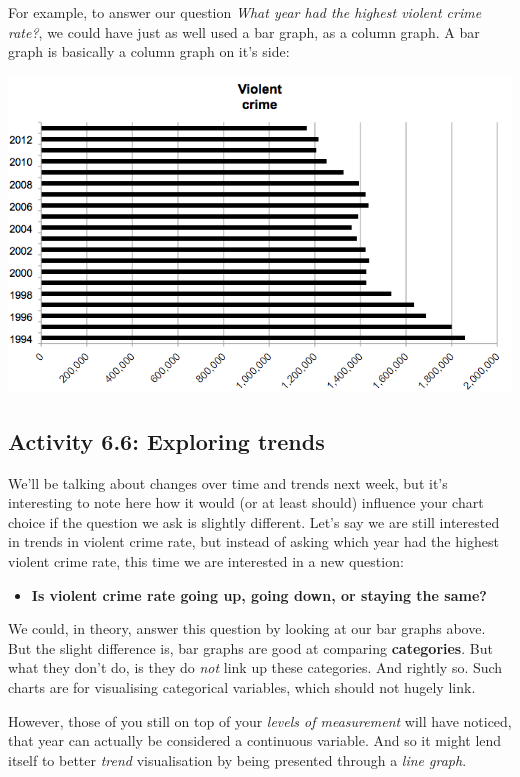 \documentclass[
]{book}
\providecommand{\tightlist}{%
  \setlength{\itemsep}{0pt}\setlength{\parskip}{0pt}}
\begin{document}
For example, to answer our question \emph{What year had the highest violent crime rate?}, we could have just as well used a bar graph, as a column graph. A bar graph is basically a column graph on it's side:

\includegraphics{imgs/bar_same_col.png}

\hypertarget{activity-6.6-exploring-trends}{%
\subsection{Activity 6.6: Exploring trends}\label{activity-6.6-exploring-trends}}

We'll be talking about changes over time and trends next week, but it's interesting to note here how it would (or at least should) influence your chart choice if the question we ask is slightly different. Let's say we are still interested in trends in violent crime rate, but instead of asking which year had the highest violent crime rate, this time we are interested in a new question:

\begin{itemize}
\tightlist
\item
  \textbf{Is violent crime rate going up, going down, or staying the same?}
\end{itemize}

We could, in theory, answer this question by looking at our bar graphs above. But the slight difference is, bar graphs are good at comparing \textbf{categories}. But what they don't do, is they do \emph{not} link up these categories. And rightly so. Such charts are for visualising categorical variables, which should not hugely link.

However, those of you still on top of your \emph{levels of measurement} will have noticed, that year can actually be considered a continuous variable. And so it might lend itself to better \emph{trend} visualisation by being presented through a \emph{line graph}.
\end{document}
